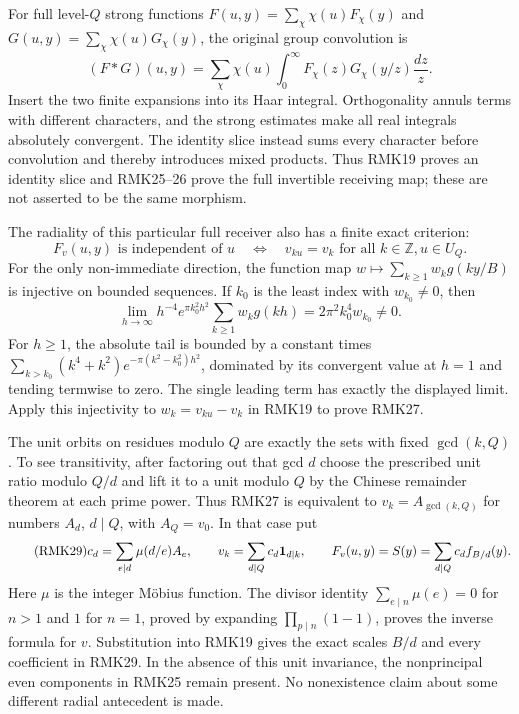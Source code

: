 For full level-$Q$ strong functions
$F(u,y)=\sum_\chi\chi(u)F_\chi(y)$ and
$G(u,y)=\sum_\chi\chi(u)G_\chi(y)$, the original group convolution is
\begin{equation}\tag{RMK26}
 (F*G)(u,y)=\sum_\chi\chi(u)
       \int_0^\infty F_\chi(z)G_\chi(y/z)\frac{dz}{z}.
\end{equation}
Insert the two finite expansions into its Haar integral. Orthogonality
annuls terms with different characters, and the strong estimates
make all real integrals absolutely convergent. The identity slice
instead sums every character before convolution and thereby introduces
mixed products. Thus RMK19 proves an identity slice and RMK25--26
prove the full invertible receiving map; these are not asserted to
be the same morphism.

The radiality of this particular full receiver also has a finite
exact criterion:
\begin{equation}\tag{RMK27}
 F_v(u,y)\text{ is independent of }u
 \quad\Longleftrightarrow\quad
 v_{ku}=v_k\text{ for all }k\in\mathbb Z, u\in U_Q.
\end{equation}
For the only non-immediate direction, the function map
$w\mapsto\sum_{k\geq1}w_kg(ky/B)$ is injective on bounded
sequences. If $k_0$ is the least index with $w_{k_0}\ne0$, then
\begin{equation}\tag{RMK28}
 \lim_{h\to\infty}h^{-4}e^{\pi k_0^2h^2}
       \sum_{k\geq1}w_kg(kh)=2\pi^2 k_0^4w_{k_0}\ne0.
\end{equation}
For $h\geq1$, the absolute tail is bounded by a constant times
$\sum_{k>k_0}(k^4+k^2)e^{-\pi(k^2-k_0^2)h^2}$, dominated by
its convergent value at $h=1$ and tending termwise to zero. The
single leading term has exactly the displayed limit. Apply this
injectivity to $w_k=v_{ku}-v_k$ in RMK19 to prove RMK27.

The unit orbits on residues modulo $Q$ are exactly the sets with
fixed $\gcd(k,Q)$. To see transitivity, after factoring out that
gcd $d$ choose the prescribed unit ratio modulo $Q/d$ and lift it
to a unit modulo $Q$ by the Chinese remainder theorem at each
prime power. Thus RMK27 is equivalent to $v_k=A_{\gcd(k,Q)}$
for numbers $A_d$, $d\mid Q$, with $A_Q=v_0$. In that case put
\begin{equation}\tag{RMK29}
 c_d=\sum_{e\mid d}\mu(d/e)A_e,\qquad
 v_k=\sum_{d\mid Q}c_d{\bf1}_{d\mid k},\qquad
 F_v(u,y)=S(y)=\sum_{d\mid Q}c_d f_{B/d}(y).
\end{equation}
Here $\mu$ is the integer M\"obius function. The divisor identity
$\sum_{e\mid n}\mu(e)=0$ for $n>1$ and $1$ for $n=1$, proved by
expanding $\prod_{p\mid n}(1-1)$, proves the inverse formula for
$v$. Substitution into RMK19 gives the exact scales $B/d$ and
every coefficient in RMK29. In the absence of this unit invariance,
the nonprincipal even components in RMK25 remain present. No
nonexistence claim about some different radial antecedent is made.

